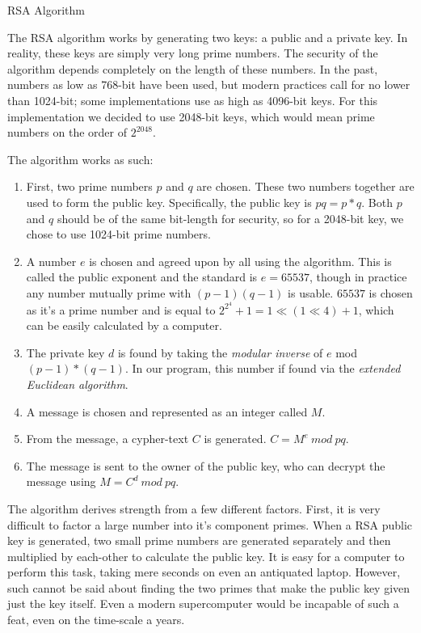 \documentclass[landscape,fontscale=.4,paperwidth=48in,paperheight=36in]{baposter} %
\begin{document}
\begin{poster}
\begin{posterbox}[name=rsa,column=13,row=0,span=17]{RSA Algorithm} %

The RSA algorithm works by generating two keys: a public and a private key. In reality, these keys are simply very long prime numbers. The security of the algorithm depends completely on the length of these numbers. In the past, numbers as low as 768-bit have been used, but modern practices call for no lower than 1024-bit; some implementations use as high as 4096-bit keys. For this implementation we decided to use 2048-bit keys, which would mean prime numbers on the order of $2^{2048}$.

The algorithm works as such:
\begin{enumerate}
	\item First, two prime numbers $p$ and $q$ are chosen. These two numbers together are used to form the public key. Specifically, the public key is ${pq = p * q}$. Both $p$ and $q$ should be of the same bit-length for security, so for a 2048-bit key, we chose to use 1024-bit prime numbers. 
	\item A number $e$ is chosen and agreed upon by all using the algorithm. This is called the public exponent and the standard is $e = 65537$, though in practice any number mutually prime with ${(p-1)(q-1)}$ is usable. $65537$ is chosen as it's a prime number and is equal to ${2^{2^4}+1 = 1 \ll (1 \ll 4) + 1}$, which can be easily calculated by a computer.
	\item The private key $d$ is found by taking the \emph{modular inverse} of $e$ mod ${(p-1)*(q-1)}$. In our program, this number if found via the \emph{extended Euclidean algorithm}.
	\item A message is chosen and represented as an integer called $M$.
	\item From the message, a cypher-text $C$ is generated. $C = M^e\ mod\ pq$.
	\item The message is sent to the owner of the public key, who can decrypt the message using $M = C^d\ mod\ pq$.
\end{enumerate}

The algorithm derives strength from  a few different factors. First, it is very difficult to factor a large number into it's component primes. When a RSA public key is generated, two small prime numbers are generated separately and then multiplied by each-other to calculate the public key. It is easy for a computer to perform this task, taking mere seconds on even an antiquated laptop. However, such cannot be said about finding the two primes that make the public key given just the key itself. Even a modern supercomputer would be incapable of such a feat, even on the time-scale a years.


\end{posterbox}
\end{poster}
\end{document}
